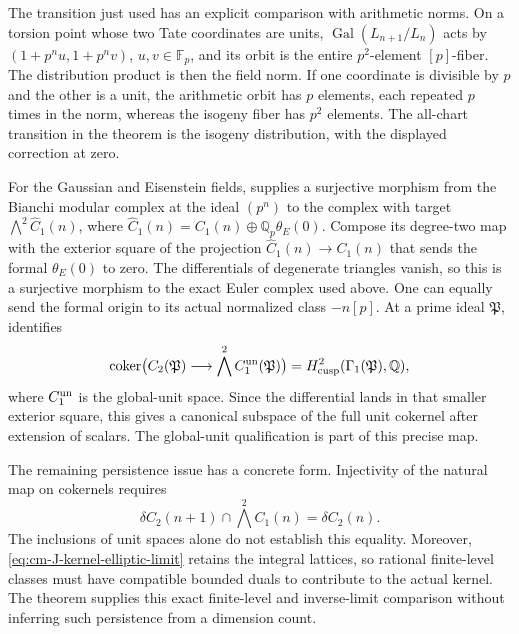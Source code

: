 The transition just used has an explicit comparison
with arithmetic norms.  On a torsion point whose two
Tate coordinates are units,
\(\operatorname{Gal}(L_{n+1}/L_n)\) acts by
\((1+p^nu,1+p^nv)\), \(u,v\in\mathbb F_p\), and
its orbit is the entire \(p^2\)-element \([p]\)-fiber.
The distribution product is then the field norm.
If one coordinate is divisible by \(p\) and the other
is a unit, the arithmetic orbit has \(p\) elements,
each repeated \(p\) times in the norm, whereas the
isogeny fiber has \(p^2\) elements.  The all-chart
transition in the theorem is the isogeny distribution,
with the displayed correction at zero.

For the Gaussian and Eisenstein fields,
\cite[Theorem 5.16, p.~34]{GoncharovEuler} supplies a
surjective morphism from the Bianchi modular complex
at the ideal \((p^n)\) to the complex with target
\(\bigwedge^2\widehat C_1(n)\), where
\(\widehat C_1(n)=C_1(n)\oplus\mathbb Q_p\theta_E(0)\).
Compose its degree-two map with the exterior square
of the projection \(\widehat C_1(n)\to C_1(n)\)
that sends the formal \(\theta_E(0)\) to zero.
The differentials of degenerate triangles vanish,
so this is a surjective morphism to the exact Euler
complex used above.  One can equally send the formal
origin to its actual normalized class \(-n[p]\).
At a prime ideal \(\mathfrak P\),
\cite[Theorem 1.2, p.~9]{GoncharovEuler} identifies
\[
 \operatorname{coker}\bigl(C_2(\mathfrak P)
       \longrightarrow\bigwedge^2C_1^{\rm un}(\mathfrak P)\bigr)
       =H^2_{\rm cusp}(\Gamma_1(\mathfrak P),\mathbb Q),
\]
where \(C_1^{\rm un}\) is the global-unit space.
Since the differential lands in that smaller exterior
square, this gives a canonical subspace of the full
unit cokernel after extension of scalars.  The
global-unit qualification is part of this precise map.

The remaining persistence issue has a concrete form.
Injectivity of the natural map on cokernels requires
\[
 \delta C_2(n+1)\cap\bigwedge^2C_1(n)=\delta C_2(n).
\]
The inclusions of unit spaces alone do not establish
this equality.  Moreover,
\eqref{eq:cm-J-kernel-elliptic-limit} retains the
integral lattices, so rational finite-level classes
must have compatible bounded duals to contribute to
the actual kernel.  The theorem supplies this exact
finite-level and inverse-limit comparison without
inferring such persistence from a dimension count.
